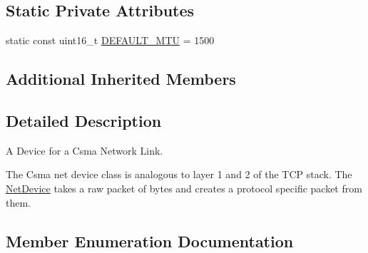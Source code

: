 \subsection*{Static Private Attributes}
\begin{DoxyCompactItemize}
\item 
static const uint16\+\_\+t \hyperlink{classns3_1_1CsmaNetDevice_aba1a157c1695a4c02b4dcba3490217e4}{D\+E\+F\+A\+U\+L\+T\+\_\+\+M\+TU} = 1500
\end{DoxyCompactItemize}
\subsection*{Additional Inherited Members}


\subsection{Detailed Description}
A Device for a Csma Network Link. 

The Csma net device class is analogous to layer 1 and 2 of the T\+CP stack. The \hyperlink{classns3_1_1NetDevice}{Net\+Device} takes a raw packet of bytes and creates a protocol specific packet from them. 

\subsection{Member Enumeration Documentation}
